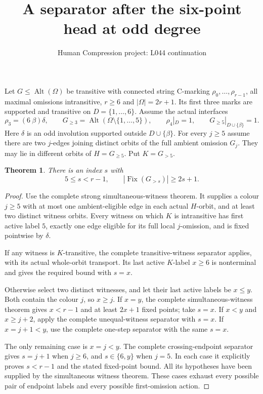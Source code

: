 \documentclass[11pt,a4paper]{article}
\title{A separator after the six-point head at odd degree}
\author{Human Compression project: L044 continuation}
\date{}
\newtheorem{theorem}{Theorem}
\begin{document}
\maketitle
Let $G\le\operatorname{Alt}(\Omega)$ be transitive with connected
string C-marking $\rho_0,\ldots,\rho_{r-1}$, all maximal omissions
intransitive, $r\ge6$ and $|\Omega|=2r+1$. Its first three marks
are supported and transitive on $D=\{1,\ldots,6\}$. Assume the
actual interfaces
\[
 \rho_3=(6\ \beta)\delta,\qquad
 G_{\ge3}=\operatorname{Alt}(\Omega\setminus\{1,\ldots,5\}),
 \qquad \rho_4|_D=1,\qquad G_{\ge5}|_{D\cup\{\beta\}}=1.
\]
Here $\delta$ is an odd involution supported outside $D\cup\{\beta\}$.
For every $j\ge5$ assume there are two $j$-edges joining distinct
orbits of the full ambient omission $G_j$. They may lie in different
orbits of $H=G_{\ge5}$. Put $K=G_{>5}$.

\begin{theorem}
There is an index $s$ with
\[
                  5\le s<r-1,\qquad
                  |\operatorname{Fix}(G_{>s})|\ge2s+1.
\]
\end{theorem}
\begin{proof}
Use the complete strong simultaneous-witness theorem. It supplies
a colour $j\ge5$ with at most one ambient-eligible edge in each
actual $H$-orbit, and at least two distinct witness orbits. Every
witness on which $K$ is intransitive has first active label $5$,
exactly one edge eligible for its full local $j$-omission, and is
fixed pointwise by $\delta$.

If any witness is $K$-transitive, the complete transitive-witness
separator applies, with its actual whole-orbit transport. Its last
active $K$-label $x\ge6$ is nonterminal and gives the required
bound with $s=x$.

Otherwise select two distinct witnesses, and let their last active
labels be $x\le y$. Both contain the colour $j$, so $x\ge j$.
If $x=y$, the complete simultaneous-witness theorem gives
$x<r-1$ and at least $2x+1$ fixed points; take $s=x$.
If $x<y$ and $x\ge j+2$, apply the complete unequal-witness
separator with $s=x$. If $x=j+1<y$, use the complete one-step
separator with the same $s=x$.

The only remaining case is $x=j<y$. The complete crossing-endpoint
separator gives $s=j+1$ when $j\ge6$, and $s\in\{6,y\}$ when
$j=5$. In each case it explicitly proves $s<r-1$ and the stated
fixed-point bound. All its hypotheses have been supplied by the
simultaneous witness theorem. These cases exhaust every possible
pair of endpoint labels and every possible first-omission action.
\end{proof}
\end{document}
